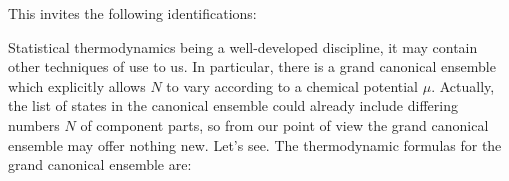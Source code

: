 {\jot
{}
}\vskip 2pt

\noindent
This invites the following identifications:

{\jot
{}
}\vskip 2pt
Statistical thermodynamics being a well-developed discipline, it may contain other techniques of use to us.
In particular, there is a grand canonical ensemble which explicitly allows $N$ to vary according to a chemical potential $\mu$.
Actually, the list of states in the canonical ensemble could already include differing numbers $N$ of component parts, 
so from our point of view the grand canonical ensemble may offer nothing new.
Let's see.
The thermodynamic formulas for the grand canonical ensemble are:

